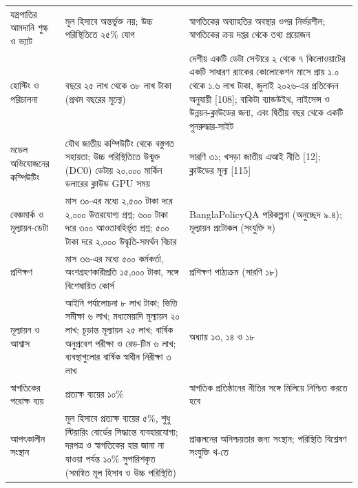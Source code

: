 \documentclass[border=10pt]{standalone}
\begin{document}
\begin{minipage}{17cm}
\begin{tabularx}{\linewidth}{@{}>{\hsize=0.679\hsize\raggedright\arraybackslash}X>{\hsize=1.286\hsize\raggedright\arraybackslash}X>{\hsize=1.036\hsize\raggedright\arraybackslash}X@{}}
যন্ত্রপাতির আমদানি শুল্ক ও ভ্যাট & মূল হিসাবে অন্তর্ভুক্ত নয়; উচ্চ পরিস্থিতিতে ২৫\% যোগ & স্বাগতিকের অব্যাহতির অবস্থার ওপর নির্ভরশীল; স্বাগতিকের ক্রয় দপ্তর থেকে তথ্য প্রয়োজন \\
হোস্টিং ও পরিচালনা & বছরে ২৫ লাখ থেকে ৩৮ লাখ টাকা (প্রথম বছরের মূল্যে) & দেশীয় একটি ডেটা সেন্টারে ২ থেকে ৭ কিলোওয়াটের একটি সাধারণ র‍্যাকের কোলোকেশন মাসে প্রায় ১.০ থেকে ১.৬ লাখ টাকা, জুলাই ২০২৬-এর প্রতিবেদন অনুযায়ী [108]; বাকিটা ব্যান্ডউইথ, লাইসেন্স ও উন্নয়ন-ক্লাউডের জন্য, এবং দ্বিতীয় বছর থেকে একটি পুনরুদ্ধার-সাইট \\
মডেল অভিযোজনের কম্পিউটিং & যৌথ জাতীয় কম্পিউটিং থেকে বস্তুগত সহায়তা; উচ্চ পরিস্থিতিতে উন্মুক্ত (DC0) ডেটায় ২০,০০০ মার্কিন ডলারের ক্লাউড GPU সময় & সারণি ৩১; খসড়া জাতীয় এআই নীতি [12]; ক্লাউডের মূল্য [115] \\
বেঞ্চমার্ক ও মূল্যায়ন-ডেটা & মাস ৩০-এর মধ্যে ২,৫০০ টাকা দরে ২,০০০ উত্তরযোগ্য প্রশ্ন; ৬০০ টাকা দরে ৩০০ আওতাবহির্ভূত প্রশ্ন; ৫০০ টাকা দরে ২,০০০ উদ্ধৃতি-সমর্থন বিচার & BanglaPolicyQA পরিকল্পনা (অনুচ্ছেদ ৯.৪); মূল্যায়ন প্রটোকল (সংযুক্তি দ) \\
প্রশিক্ষণ & মাস ৩৬-এর মধ্যে ৫০০ কর্মকর্তা, অংশগ্রহণকারীপ্রতি ১৫,০০০ টাকা, সঙ্গে বিশেষায়িত কোর্স & প্রশিক্ষণ পাঠ্যক্রম (সারণি ১৮) \\
মূল্যায়ন ও আশ্বাস & আইনি পর্যালোচনা ৮ লাখ টাকা; ভিত্তি সমীক্ষা ৬ লাখ; মধ্যমেয়াদি মূল্যায়ন ২০ লাখ; চূড়ান্ত মূল্যায়ন ২৫ লাখ; বার্ষিক অনুপ্রবেশ পরীক্ষা ও রেড-টিম ৬ লাখ; ব্যবস্থাগুলোর বার্ষিক স্বাধীন নিরীক্ষা ৩ লাখ & অধ্যায় ১৩, ১৪ ও ১৮ \\
স্বাগতিকের পরোক্ষ ব্যয় & প্রত্যক্ষ ব্যয়ের ১০\% & স্বাগতিক প্রতিষ্ঠানের নীতির সঙ্গে মিলিয়ে নিশ্চিত করতে হবে \\
আপৎকালীন সংস্থান & মূল হিসাবে প্রত্যক্ষ ব্যয়ের ৫\%, শুধু স্টিয়ারিং বোর্ডের সিদ্ধান্তে ব্যবহারযোগ্য; দরপত্র ও স্বাগতিকের হার জানা না যাওয়া পর্যন্ত ১০\% সুপারিশকৃত (সমন্বিত মূল হিসাব ও উচ্চ পরিস্থিতি) & প্রাক্কলনের অনিশ্চয়তার জন্য সংস্থান; পরিস্থিতি বিশ্লেষণ সংযুক্তি থ-তে \\
\bottomrule
\end{tabularx}
\par{}
\par{}
\end{minipage}
\end{document}
